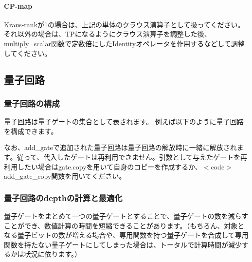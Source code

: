\paragraph*{C\+P-\/map}

Kraus-\/rankが1の場合は、上記の単体のクラウス演算子として扱ってください。それ以外の場合は、\+T\+Pになるようにクラウス演算子を調整した後、{\ttfamily multiply\+\_\+scalar}関数で定数倍にした{\ttfamily Identity}オペレータを作用するなどして調整してください。

\subsection*{量子回路}

\subsubsection*{量子回路の構成}

量子回路は量子ゲートの集合として表されます。 例えば以下のように量子回路を構成できます。


\begin{DoxyCode}{0}
\DoxyCodeLine{}
\DoxyCodeLine{}
\DoxyCodeLine{}
\DoxyCodeLine{}
\DoxyCodeLine{}
\end{DoxyCode}


なお、{\ttfamily add\+\_\+gate}で追加された量子回路は量子回路の解放時に一緒に解放されます。従って、代入したゲートは再利用できません。引数として与えたゲートを再利用したい場合はgate.\+copyを用いて自身のコピーを作成するか、$<$code$>$add\+\_\+gate\+\_\+copy関数を用いてください。

\subsubsection*{量子回路のdepthの計算と最適化}

量子ゲートをまとめて一つの量子ゲートとすることで、量子ゲートの数を減らすことができ、数値計算の時間を短縮できることがあります。（もちろん、対象となる量子ビットの数が増える場合や、専用関数を持つ量子ゲートを合成して専用関数を持たない量子ゲートにしてしまった場合は、トータルで計算時間が減少するかは状況に依ります。）


